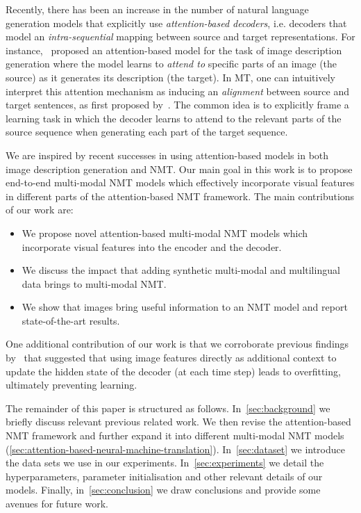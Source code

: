 \documentclass[11pt,twocolumn]{article}
\begin{document}
Recently, there has been an increase in the number of natural language generation models that explicitly use \emph{attention-based decoders}, i.e. decoders that model an \emph{intra-sequential} mapping between source and target representations.
For instance,~ proposed an attention-based model
for the task of image description generation where the model learns to \emph{attend to}
specific parts of an image (the source)
as it generates its description (the target).
In MT,
one can intuitively interpret this attention mechanism as inducing
an \emph{alignment} between source and target sentences,
as first proposed by~.
The common idea is to explicitly frame a learning task in which
the decoder learns to attend to the relevant parts of the source sequence
when generating each part of the target sequence.

We are inspired by recent successes in using attention-based models in both image description generation and NMT.
Our main goal in this work is to propose end-to-end multi-modal NMT models which effectively incorporate visual features in different parts of the attention-based NMT framework.
The main contributions of our work are:
\begin{itemize}
 \item We propose novel attention-based multi-modal NMT models which incorporate visual features into the encoder and the decoder.
 
 \item We discuss the impact that adding synthetic multi-modal and multilingual data brings to multi-modal NMT.
 
 \item We show that images bring useful information to an NMT model and report state-of-the-art results.
\end{itemize}

One additional contribution of our work is that
we corroborate previous findings
by~ that suggested that
using image features directly as additional context to update the hidden state of the decoder
(at each time step) leads to overfitting, ultimately preventing learning.

The remainder of this paper is structured as follows.
In~\cref{sec:background} we briefly discuss relevant previous related work.
We then revise the attention-based NMT framework and further expand it into different multi-modal NMT models (\cref{sec:attention-based-neural-machine-translation}).
In~\cref{sec:dataset} we introduce the data sets we use in our experiments. In~\cref{sec:experiments} we detail the hyperparameters, parameter initialisation and other relevant details of our models.
Finally, in~\cref{sec:conclusion} we draw conclusions and provide some avenues for future work.
\end{document}
